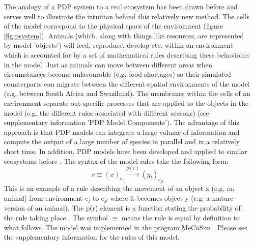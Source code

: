 The analogy of a PDP system to a real ecosystem has been drawn before \citep{colomer2013population,colomer2011bio,margalida2011can} and serves well to illustrate the intuition behind this relatively new method. The cells of the model correspond to the physical space of the environment (figure \ref{fig:psystem}). Animals (which, along with things like resources, are represented by model 'objects') will feed, reproduce, develop etc. within an environment which is accounted for by a set of mathematical rules describing these behaviours in the model. Just as animals can move between different areas when circumstances become unfavourable (e.g. food shortages) so their simulated counterparts can migrate between the different spatial environments of the model (e.g. between South Africa and Swaziland). The membranes within the cells of an environment separate out specific processes that are applied to the objects in the model (e.g. the different rules associated with different seasons) (see supplementary information 'PDP Model Components'). The advantage of this approach is that PDP models can integrate a large volume of information and compute the output of a large number of species in parallel and in a relatively short time. In addition, PDP models have been developed and applied to similar ecosystems before \citep{margalida2012modelling}. The syntax of the model rules take the following form:
\[r \equiv \left(x\right)_{e_{j}} \xrightarrow{p\left(r\right)}\left ( y_{l} \right )_{e_{jl}}\]
This is an example of a rule describing the movement of an object x (e.g. an animal) from environment e$_{j}$ to e$_{jl}$  where it becomes object y (e.g. a mature version of an animal). The p(r) element is a function stating the probability of the rule taking place \citep{colomer2013population}. The symbol $\equiv$ means the rule is equal by definition to what follows. The model was implemented in the program MeCoSim \citep{perez2010mecosim}. Please see the supplementary information for the rules of this model. 

